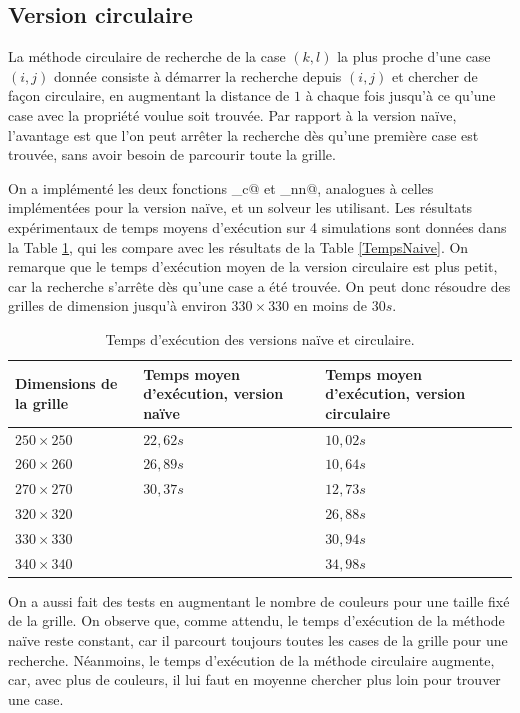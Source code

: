 \documentclass[a4paper,12pt]{article}
\numberwithin{equation}{section}
\begin{document}
\subsection{Version circulaire}

La méthode circulaire de recherche de la case $(k, l)$ la plus proche d'une case $(i, j)$ donnée consiste à démarrer la recherche depuis $(i, j)$ et chercher de façon circulaire, en augmentant la distance de $1$ à chaque fois jusqu'à ce qu'une case avec la propriété voulue soit trouvée. Par rapport à la version naïve, l'avantage est que l'on peut arrêter la recherche dès qu'une première case est trouvée, sans avoir besoin de parcourir toute la grille.

On a implémenté les deux fonctions \verb@RechercheCaseCirculaire_c@ et \verb@Recherche@\allowbreak\verb@CaseCirculaire_nn@, analogues à celles implémentées pour la version naïve, et un solveur les utilisant. Les résultats expérimentaux de temps moyens d'exécution sur 4 simulations sont données dans la Table \ref{TempsCirculaire}, qui les compare avec les résultats de la Table \ref{TempsNaive}. On remarque que le temps d'exécution moyen de la version circulaire est plus petit, car la recherche s'arrête dès qu'une case a été trouvée. On peut donc résoudre des grilles de dimension jusqu'à environ $330 \times 330$ en moins de $30 s$.

\begin{table}[ht]
\centering
\begin{tabular}{>{\centering} m{} >{\centering} m{} >{\centering} m{}}
\hline\hline
Dimensions de la grille & Temps moyen d'exécution, version naïve & Temps moyen d'exécution, version circulaire \tabularnewline
\hline
$250 \times 250$ & $22,62 s$ & $10,02 s$ \tabularnewline
$260 \times 260$ & $26,89 s$ & $10,64 s$ \tabularnewline
$270 \times 270$ & $30,37 s$ & $12,73 s$ \tabularnewline
$320 \times 320$ &           & $26,88 s$ \tabularnewline
$330 \times 330$ &           & $30,94 s$ \tabularnewline
$340 \times 340$ &           & $34,98 s$ \tabularnewline
\hline\hline
\end{tabular}
\caption{Temps d'exécution des versions naïve et circulaire.}
\label{TempsCirculaire}
\end{table}

On a aussi fait des tests en augmentant le nombre de couleurs pour une taille fixé de la grille. On observe que, comme attendu, le temps d'exécution de la méthode naïve reste constant, car il parcourt toujours toutes les cases de la grille pour une recherche. Néanmoins, le temps d'exécution de la méthode circulaire augmente, car, avec plus de couleurs, il lui faut en moyenne chercher plus loin pour trouver une case.
\end{document}
